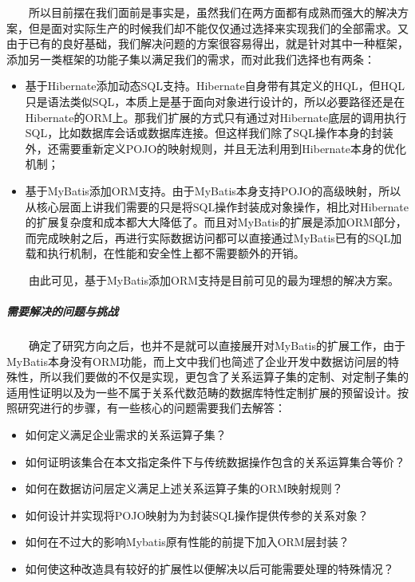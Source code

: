 \documentclass[]{article}
\begin{document}
　　所以目前摆在我们面前是事实是，虽然我们在两方面都有成熟而强大的解决方案，但是面对实际生产的时候我们却不能仅仅通过选择来实现我们的全部需求。又由于已有的良好基础，我们解决问题的方案很容易得出，就是针对其中一种框架，添加另一类框架的功能子集以满足我们的需求，而对此我们选择也有两条：

\begin{itemize}
\itemsep1pt\parskip0pt
\item
  基于Hibernate添加动态SQL支持。Hibernate自身带有其定义的HQL，但HQL只是语法类似SQL，本质上是基于面向对象进行设计的，所以必要路径还是在Hibernate的ORM上。那我们扩展的方式只有通过对Hibernate底层的调用执行SQL，比如数据库会话或数据库连接。但这样我们除了SQL操作本身的封装外，还需要重新定义POJO的映射规则，并且无法利用到Hibernate本身的优化机制；
\item
  基于MyBatis添加ORM支持。由于MyBatis本身支持POJO的高级映射，所以从核心层面上讲我们需要的只是将SQL操作封装成对象操作，相比对Hibernate的扩展复杂度和成本都大大降低了。而且对MyBatis的扩展是添加ORM部分，而完成映射之后，再进行实际数据访问都可以直接通过MyBatis已有的SQL加载和执行机制，在性能和安全性上都不需要额外的开销。
\end{itemize}

　　由此可见，基于MyBatis添加ORM支持是目前可见的最为理想的解决方案。

\subparagraph{需要解决的问题与挑战}\label{ux9700ux8981ux89e3ux51b3ux7684ux95eeux9898ux4e0eux6311ux6218}

　　确定了研究方向之后，也并不是就可以直接展开对MyBatis的扩展工作，由于MyBatis本身没有ORM功能，而上文中我们也简述了企业开发中数据访问层的特殊性，所以我们要做的不仅是实现，更包含了关系运算子集的定制、对定制子集的适用性证明以及为一些不属于关系代数范畴的数据库特性定制扩展的预留设计。按照研究进行的步骤，有一些核心的问题需要我们去解答：

\begin{itemize}
\itemsep1pt\parskip0pt
\item
  如何定义满足企业需求的关系运算子集？
\item
  如何证明该集合在本文指定条件下与传统数据操作包含的关系运算集合等价？
\item
  如何在数据访问层定义满足上述关系运算子集的ORM映射规则？
\item
  如何设计并实现将POJO映射为为封装SQL操作提供传参的关系对象？
\item
  如何在不过大的影响Mybatis原有性能的前提下加入ORM层封装？
\item
  如何使这种改造具有较好的扩展性以便解决以后可能需要处理的特殊情况？
\end{itemize}
\end{document}
